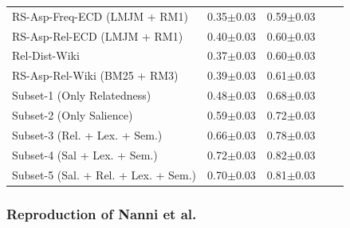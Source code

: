 \begin{table}[t]
\begin{tabular}{@{}lllll@{}}
     
      RS-Asp-Freq-ECD (LMJM + RM1)  &     
      0.35$\pm$0.03 &
      0.59$\pm$0.03
      \\
      
       
      RS-Asp-Rel-ECD (LMJM + RM1) &     
      0.40$\pm$0.03 &
      0.60$\pm$0.03
      \\
       \midrule
      
      
      Rel-Dist-Wiki  &    
      0.37$\pm$0.03 &
      0.60$\pm$0.03
      \\
      
      
       
      RS-Asp-Rel-Wiki (BM25 + RM3)  &     
      0.39$\pm$0.03 &
      0.61$\pm$0.03
      \\
      \midrule
      
       Subset-1 (Only Relatedness) &
      0.48$\pm$0.03 &
      0.68$\pm$0.03
      \\
      
      
      Subset-2 (Only Salience) &
      0.59$\pm$0.03 &
      0.72$\pm$0.03
      \\
      
       Subset-3 (Rel. + Lex. + Sem.) &
      0.66$\pm$0.03 &
      0.78$\pm$0.03
      \\
      
       Subset-4 (Sal + Lex. + Sem.) &
      
      0.72$\pm$0.03 &
      0.82$\pm$0.03
      \\
      
      
      Subset-5 (Sal. + Rel. + Lex. + Sem.) &
      0.70$\pm$0.03 &
      0.81$\pm$0.03
      \\
     
      
      

     
      
       \bottomrule
    \end{tabular}
\end{table}


\subsubsection{Reproduction of Nanni et al.}
\label{subsubsec:Reproduction of Nanni et al}

 

%


  